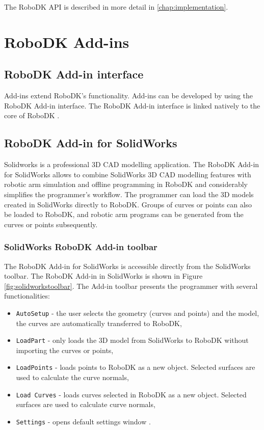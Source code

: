 The RoboDK API is described in more detail in \autoref{chap:implementation}.

\section{RoboDK Add-ins}

\subsection{RoboDK Add-in interface}

Add-ins extend RoboDK's functionality. Add-ins can be developed by using the RoboDK Add-in interface. The RoboDK Add-in interface is linked natively to the core of RoboDK \cite{robodkaddininterface}.

\subsection{RoboDK Add-in for SolidWorks}

Solidworks is a professional 3D CAD modelling application. The RoboDK Add-in for SolidWorks allows to combine SolidWorks 3D CAD modelling features with robotic arm simulation and offline programming in RoboDK and considerably simplifies the programmer's workflow. The programmer can load the 3D models created in SolidWorks directly to RoboDK. Groups of curves or points can also be loaded to RoboDK, and robotic arm programs can be generated from the curves or points subsequently.

\subsubsection*{SolidWorks RoboDK Add-in toolbar}

The RoboDK Add-in for SolidWorks is accessible directly from the SolidWorks toolbar.  The RoboDK Add-in in SolidWorks is shown in Figure  \ref{fig:solidworkstoolbar}. The Add-in toolbar presents the programmer with several functionalities:

\begin{itemize}
    \item \texttt{AutoSetup} - the user selects the geometry (curves and points) and the model, the curves are automatically transferred to RoboDK,
    \item \texttt{LoadPart} - only loads the 3D model from SolidWorks to RoboDK without importing the curves or points,
    \item \texttt{LoadPoints} - loads points to RoboDK as a new object. Selected surfaces are used to calculate the curve normals, 
    \item \texttt{Load Curves} -  loads curves selected in RoboDK as a new object. Selected surfaces are used to calculate curve normals, 
    \item \texttt{Settings} - opens default settings window \cite{robodksolidworks}.
\end{itemize}

